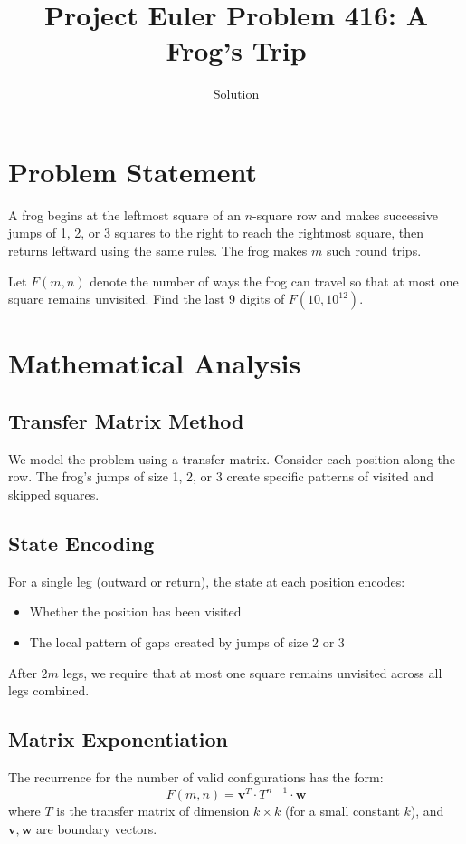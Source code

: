 \documentclass[12pt]{article}
\title{Project Euler Problem 416: A Frog's Trip}
\author{Solution}
\date{}
\begin{document}
\maketitle

\section{Problem Statement}
A frog begins at the leftmost square of an $n$-square row and makes successive jumps of 1, 2, or 3 squares to the right to reach the rightmost square, then returns leftward using the same rules. The frog makes $m$ such round trips.

Let $F(m,n)$ denote the number of ways the frog can travel so that at most one square remains unvisited. Find the last 9 digits of $F(10, 10^{12})$.

\section{Mathematical Analysis}

\subsection{Transfer Matrix Method}
We model the problem using a transfer matrix. Consider each position along the row. The frog's jumps of size 1, 2, or 3 create specific patterns of visited and skipped squares.

\subsection{State Encoding}
For a single leg (outward or return), the state at each position encodes:
\begin{itemize}
    \item Whether the position has been visited
    \item The local pattern of gaps created by jumps of size 2 or 3
\end{itemize}

After $2m$ legs, we require that at most one square remains unvisited across all legs combined.

\subsection{Matrix Exponentiation}
The recurrence for the number of valid configurations has the form:
\[
F(m,n) = \mathbf{v}^T \cdot T^{n-1} \cdot \mathbf{w}
\]
where $T$ is the transfer matrix of dimension $k \times k$ (for a small constant $k$), and $\mathbf{v}, \mathbf{w}$ are boundary vectors.
\end{document}
